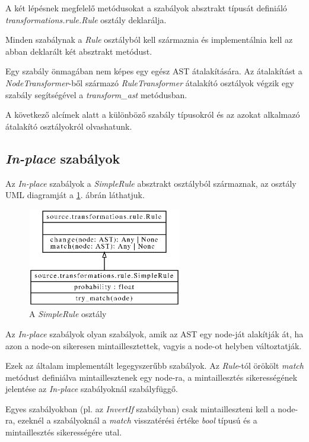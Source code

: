 A két lépésnek megfelelő metódusokat a szabályok absztrakt típusát definiáló
\emph{transformations.rule.Rule} osztály deklarálja.

Minden szabálynak a \emph{Rule} osztályból kell származnia és implementálnia kell
az abban deklarált két absztrakt metódust.

Egy szabály önmagában nem képes egy egész AST átalakítására.
Az átalakítást a \emph{NodeTransformer}-ből származó \emph{RuleTransformer}
átalakító osztályok végzik egy szabály segítségével a \emph{transform\_ast} metódusban.

A következő alcímek alatt a különböző szabály típusokról és az azokat alkalmazó
átalakító osztályokról olvashatunk.

\subsection{\emph{In-place} szabályok}

Az \emph{In-place} szabályok a \emph{SimpleRule} absztrakt osztályból származnak,
az osztály UML diagramját a \ref{fig:SimpleRule}. ábrán láthatjuk.

\begin{figure}[H]
	\centering
	\includegraphics[width=0.6\textwidth]{images/uml/SimpleRule.eps}
	\caption{A \emph{SimpleRule} osztály}
	\label{fig:SimpleRule}
\end{figure}

Az \emph{In-place} szabályok olyan szabályok, amik az AST egy node-ját alakítják át,
ha azon a node-on sikeresen mintaillesztettek, vagyis a node-ot helyben változtatják.

Ezek az általam implementált legegyszerűbb szabályok.
Az \emph{Rule}-tól örökölt \emph{match} metódust definiálva mintaillesztenek egy node-ra,
a mintaillesztés sikerességének jelentése az \emph{In-place} szabályoknál szabályfüggő.

Egyes szabályokban (pl. az \emph{InvertIf} szabályban) csak mintailleszteni kell a node-ra,
ezeknél a szabályoknál a \emph{match} visszatérési értéke \emph{bool} típusú
és a mintaillesztés sikerességére utal.

